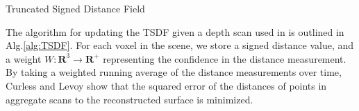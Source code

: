 \documentclass[conference]{IEEEtran}
\newcommand{\algoref}[1]{Alg.\ref{#1}}
\begin{document}
% 
% 
% 

\begin{algorithm}[t!]
	\caption{Truncated Signed Distance Field}
	\label{alg:TSDF}
	\begin{algorithmic}[1]
		 
			 
				 
				\label{alg:line:dynamic_tsdf}
			     
				    	\label{alg:line:voxel_carve}
					\EndIf
			    \EndFor
				 		 
					\label{alg:line:tsdf_update}
				\EndFor
			\EndFor
		\EndFor
	\end{algorithmic}
\end{algorithm}

The algorithm for updating the TSDF given a depth scan used in
\cite{Curless1996} is outlined in
\algoref{alg:TSDF}. For each voxel in the scene, we store a signed distance
value, and a weight $W : \mathbf{R}^3 \to \mathbf{R^{+}}$ representing the confidence
in the distance measurement. By taking a weighted running average of the
distance measurements over time, Curless and Levoy show that the squared error
of the distances of points in aggregate scans to the reconstructed surface is
minimized.
\end{document}
